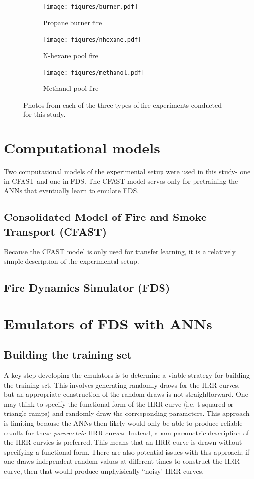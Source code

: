 \documentclass{article}
\begin{document}
\begin{figure}[htbp]
  \centering
  \begin{subfigure}[t]{.301\textwidth}
      \centering
      \texttt{[image: figures/burner.pdf]}
      \caption{Propane burner fire}
      \label{fig:fire_image}
  \end{subfigure}
  \begin{subfigure}[t]{.3\textwidth}
      \centering
      \texttt{[image: figures/nhexane.pdf]}
      \caption{N-hexane pool fire}
      \label{fig:brightness_heatmap}
  \end{subfigure}
  \begin{subfigure}[t]{.3\textwidth}
      \centering
      \texttt{[image: figures/methanol.pdf]}
      \caption{Methanol pool fire}
      \label{fig:binary_fire_image}
  \end{subfigure}
  \caption{Photos from each of the three types of fire experiments conducted for this study.}
\end{figure}
\section{Computational models}
Two computational models of the experimental setup were used in this study- one in CFAST and one in FDS. The CFAST model serves only for pretraining the ANNs that eventually learn to emulate FDS. 
\subsection{Consolidated Model of Fire and Smoke Transport (CFAST)}
Because the CFAST model is only used for transfer learning, it is a relatively simple description of the experimental setup. 


\subsection{Fire Dynamics Simulator (FDS)}
\section{Emulators of FDS with ANNs}
\subsection{Building the training set}
A key step developing the emulators is to determine a viable strategy for building the training set. This involves generating randomly draws for the HRR curves, but an appropriate construction of the random draws is not straightforward. One may think to specify the functional form of the HRR curve (i.e. t-squared or triangle ramps) and randomly draw the corresponding parameters. This approach is limiting because the ANNs then likely would only be able to produce reliable results for these \textit{parametric} HRR curves. Instead, a non-parametric description of the HRR curvies is preferred. This means that an HRR curve is drawn without specifying a functional form. There are also potential issues with this approach; if one draws independent random values at different times to construct the HRR curve, then that would produce unphyisically ``noisy" HRR curves.
\end{document}
